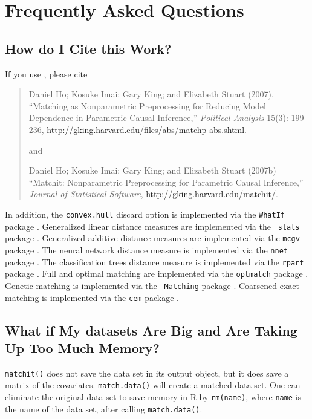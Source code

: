 \chapter{Frequently Asked Questions}

\section{How do I Cite this Work?}

If you use \MatchIt, please cite\nocite{HoImaKin07,HoImaKin07a}
\begin{verse}
  Daniel Ho; Kosuke Imai; Gary King; and Elizabeth Stuart (2007),
  ``Matching as Nonparametric Preprocessing for Reducing Model
  Dependence in Parametric Causal Inference,'' \emph{Political
    Analysis} 15(3): 199-236,
  \url{http://gking.harvard.edu/files/abs/matchp-abs.shtml}.

and 

Daniel Ho; Kosuke Imai; Gary King; and Elizabeth Stuart (2007b)
``Matchit: Nonparametric Preprocessing for Parametric Causal
Inference,'' \emph{Journal of Statistical Software},
\url{http://gking.harvard.edu/matchit/}.
\end{verse}

In addition, the {\tt convex.hull} discard option is implemented via
the {\tt WhatIf} package \citep{KinZen06,KinZen07,StoKinZen05}.
Generalized linear distance measures are implemented via the {\tt
  stats} package \citep{VenRip02}.  Generalized additive distance
measures are implemented via the {\tt mcgv} package \citep{HasTib90}.
The neural network distance measure is implemented via the {\tt nnet}
package \citep{Ripley96}.  The classification trees distance measure
is implemented via the {\tt rpart} package \citep{BreFriOls84}.  Full
and optimal matching are implemented via the {\tt optmatch} package
\citep{Hansen04}.  Genetic matching is implemented via the {\tt
  Matching} package \citep{DiaSek05}.  Coarsened exact matching is
implemented via the \texttt{cem} package
\citep{IacKinPor08,IacKinPor08b}.

\section{What if My datasets Are Big and Are Taking Up
  Too Much Memory?}

{\tt matchit()} does not save the data set in its output object, but
it does save a matrix of the covariates.  {\tt match.data()} will
create a matched data set. One can eliminate the original data set to
save memory in R by {\tt rm(name)}, where {\tt name} is the name of
the data set, after calling {\tt match.data()}.

